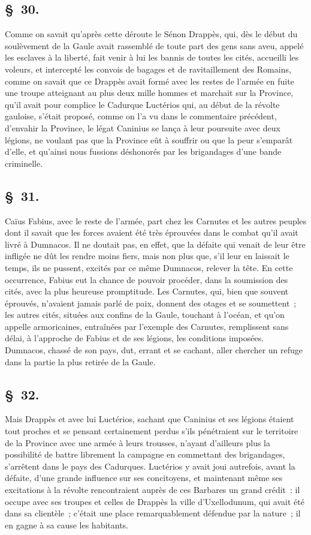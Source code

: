 \documentclass[french,twoside]{book} %
\begin{document}
\subsection[{§ 30.}]{ \textsc{§ 30.} }
\noindent Comme on savait qu’après cette déroute le Sénon Drappès, qui, dès le début du soulèvement de la Gaule avait rassemblé de toute part des gens sans aveu, appelé les esclaves à la liberté, fait venir à lui les bannis de toutes les cités, accueilli les voleurs, et intercepté les convois de bagages et de ravitaillement des Romains, comme on savait que ce Drappès avait formé avec les restes de l’armée en fuite une troupe atteignant au plus deux mille hommes et marchait sur la Province, qu’il avait pour complice le Cadurque Luctérios qui, au début de la révolte gauloise, s’était proposé, comme on l’a vu dans le commentaire précédent, d’envahir la Province, le légat Caninius se lança à leur poursuite avec deux légions, ne voulant pas que la Province eût à souffrir ou que la peur s’emparât d’elle, et qu’ainsi nous fussions déshonorés par les brigandages d’une bande criminelle.
\subsection[{§ 31.}]{ \textsc{§ 31.} }
\noindent Caïus Fabius, avec le reste de l’armée, part chez les Carnutes et les autres peuples dont il savait que les forces avaient été très éprouvées dans le combat qu’il avait livré à Dumnacos. Il ne doutait pas, en effet, que la défaite qui venait de leur être infligée ne dût les rendre moins fiers, mais non plus que, s’il leur en laissait le temps, ils ne pussent, excités par ce même Dumnacos, relever la tête. En cette occurrence, Fabius eut la chance de pouvoir procéder, dans la soumission des cités, avec la plus heureuse promptitude. Les Carnutes, qui, bien que souvent éprouvés, n’avaient jamais parlé de paix, donnent des otages et se soumettent ; les autres cités, situées aux confins de la Gaule, touchant à l’océan, et qu’on appelle armoricaines, entraînées par l’exemple des Carnutes, remplissent sans délai, à l’approche de Fabius et de ses légions, les conditions imposées. Dumnacos, chassé de son pays, dut, errant et se cachant, aller chercher un refuge dans la partie la plus retirée de la Gaule.
\subsection[{§ 32.}]{ \textsc{§ 32.} }
\noindent Mais Drappès et avec lui Luctérios, sachant que Caninius et ses légions étaient tout proches et se pensant certainement perdus s’ils pénétraient sur le territoire de la Province avec une armée à leurs trousses, n’ayant d’ailleurs plus la possibilité de battre librement la campagne en commettant des brigandages, s’arrêtent dans le pays des Cadurques. Luctérios y avait joui autrefois, avant la défaite, d’une grande influence sur ses concitoyens, et maintenant même ses excitations à la révolte rencontraient auprès de ces Barbares un grand crédit : il occupe avec ses troupes et celles de Drappès la ville d’Uxellodunum, qui avait été dans sa clientèle ; c’était une place remarquablement défendue par la nature ; il en gagne à sa cause les habitants.
\end{document}

